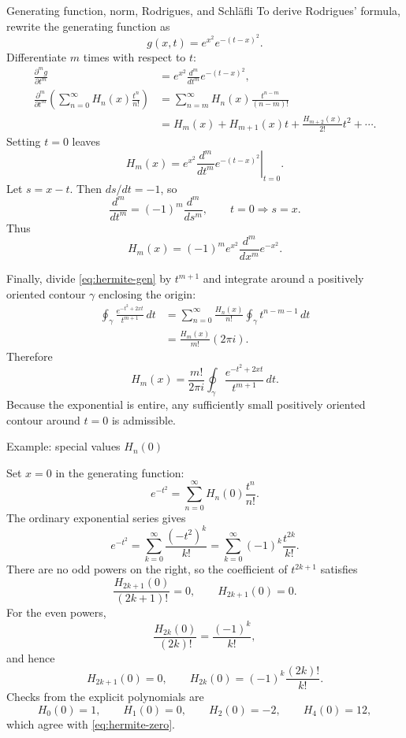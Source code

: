 \documentclass[11pt]{beamer}
\begin{document}
\begin{frame}[allowframebreaks]{Generating function, norm, Rodrigues, and Schl\"afli}
To derive Rodrigues' formula, rewrite the generating function as
\[
  g(x,t)=e^{x^2}e^{-(t-x)^2}.
\]
Differentiate $m$ times with respect to $t$:
\begin{align*}
  \frac{\partial^m g}{\partial t^m}
  &=e^{x^2}\frac{d^m}{dt^m}e^{-(t-x)^2},\\
  \frac{\partial^m}{\partial t^m}
  \left(\sum_{n=0}^{\infty}H_n(x)\frac{t^n}{n!}\right)
  &=\sum_{n=m}^{\infty}H_n(x)\frac{t^{n-m}}{(n-m)!}\\
  &=H_m(x)+H_{m+1}(x)t+\frac{H_{m+2}(x)}{2!}t^2+\cdots.
\end{align*}
Setting $t=0$ leaves
\[
  H_m(x)=e^{x^2}\left.\frac{d^m}{dt^m}e^{-(t-x)^2}\right|_{t=0}.
\]
Let $s=x-t$. Then $ds/dt=-1$, so
\[
  \frac{d^m}{dt^m}=(-1)^m\frac{d^m}{ds^m},
  \qquad t=0\Longrightarrow s=x.
\]
Thus
\begin{equation}
  H_m(x)=(-1)^m e^{x^2}\frac{d^m}{dx^m}e^{-x^2}.
  \label{eq:hermite-rodrigues}
\end{equation}

Finally, divide \eqref{eq:hermite-gen} by $t^{m+1}$ and integrate around a positively
oriented contour $\gamma$ enclosing the origin:
\begin{align*}
  \oint_\gamma\frac{e^{-t^2+2xt}}{t^{m+1}}\,dt
  &=\sum_{n=0}^{\infty}\frac{H_n(x)}{n!}
    \oint_\gamma t^{n-m-1}\,dt\\
  &=\frac{H_m(x)}{m!}(2\pi i).
\end{align*}
Therefore
\begin{equation}
  H_m(x)=\frac{m!}{2\pi i}
  \oint_\gamma\frac{e^{-t^2+2xt}}{t^{m+1}}\,dt.
  \label{eq:hermite-schlafli}
\end{equation}
Because the exponential is entire, any sufficiently small positively oriented contour
around $t=0$ is admissible.
\end{frame}

\begin{frame}[allowframebreaks]{Example: special values $H_n(0)$}
\footnotesize

Set $x=0$ in the generating function:
\[
  e^{-t^2}
  =\sum_{n=0}^{\infty}H_n(0)\frac{t^n}{n!}.
\]
The ordinary exponential series gives
\[
  e^{-t^2}
  =\sum_{k=0}^{\infty}\frac{(-t^2)^k}{k!}
  =\sum_{k=0}^{\infty}(-1)^k\frac{t^{2k}}{k!}.
\]
There are no odd powers on the right, so the coefficient of $t^{2k+1}$ satisfies
\[
  \frac{H_{2k+1}(0)}{(2k+1)!}=0,
  \qquad
  H_{2k+1}(0)=0.
\]
For the even powers,
\[
  \frac{H_{2k}(0)}{(2k)!}=\frac{(-1)^k}{k!},
\]
and hence
\begin{equation}
  H_{2k+1}(0)=0,
  \qquad
  H_{2k}(0)=(-1)^k\frac{(2k)!}{k!}.
  \label{eq:hermite-zero}
\end{equation}
Checks from the explicit polynomials are
\[
  H_0(0)=1,
  \qquad H_1(0)=0,
  \qquad H_2(0)=-2,
  \qquad H_4(0)=12,
\]
which agree with \eqref{eq:hermite-zero}.
\end{frame}
\end{document}
